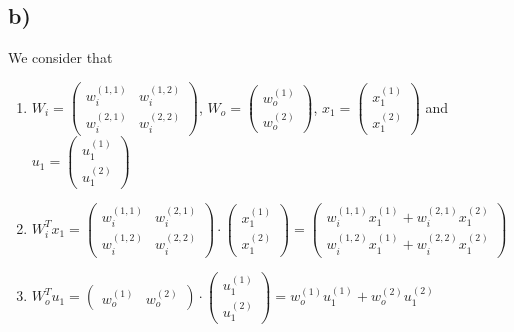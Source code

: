 \documentclass[a4paper]{article}
\begin{document}
    \subsection*{b)}
        We consider that 
        \begin{enumerate}
            \item $W_i = \left( \begin{matrix} w_i^{(1,1)} & w_i^{(1,2)} \\ w_i^{(2,1)} & w_i^{(2,2)} \end{matrix} \right)$,
                $W_o = \left( \begin{matrix} w_o^{(1)} \\ w_o^{(2)} \end{matrix} \right)$,
                $x_1 = \left( \begin{matrix} x_1^{(1)} \\ x_1^{(2)} \end{matrix} \right)$ and
                $u_1 = \left( \begin{matrix} u_1^{(1)} \\ u_1^{(2)} \end{matrix} \right)$
            \item $W_i^T x_1 = \left( \begin{matrix} w_i^{(1,1)} & w_i^{(2,1)} \\ w_i^{(1,2)} & w_i^{(2,2)} \end{matrix} \right) 
                \cdot \left( \begin{matrix} x_1^{(1)} \\ x_1^{(2)} \end{matrix} \right)
                = \left( \begin{matrix} w_i^{(1,1)} x_1^{(1)} + w_i^{(2,1)} x_1^{(2)} \\ w_i^{(1,2)} x_1^{(1)} + w_i^{(2,2)} x_1^{(2)} \end{matrix} \right)$
            \item $W_o^T u_1 = \left( \begin{matrix} w_o^{(1)} & w_o^{(2)} \end{matrix} \right) 
                \cdot \left( \begin{matrix} u_1^{(1)} \\ u_1^{(2)} \end{matrix} \right) = w_o^{(1)} u_1^{(1)} + w_o^{(2)} u_1^{(2)}$
        \end{enumerate}
        
\end{document}
